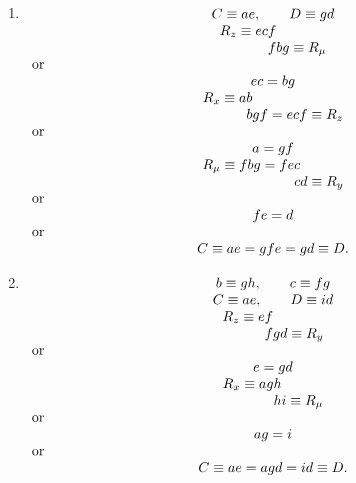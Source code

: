 \begin{enumerate}
\bigskip

\item $\begin{array}[t]{c}
C \equiv ae, \qquad D \equiv gd\\
\begin{array}{r@{}c@{}l}
R_z \equiv ec&f&\\
      &f&bg \equiv R_\mu
\end{array}\\
\makebox[\textwidth][l]{or}\\
ec = bg\\
\begin{array}{r@{}c@{}l}
R_x \equiv a&b&\\
      &b&gf = ecf \equiv  R_z
\end{array}\\
\makebox[\textwidth][l]{or}\\
a = gf\\
\begin{array}{r@{}c@{}l}
R_\mu \equiv fbg = fe&c&\\
      &c&d \equiv  R_y
\end{array}\\
\makebox[\textwidth][l]{or}\\
fe = d\\
\makebox[\textwidth][l]{or}\\
C \equiv ae = gfe = gd \equiv D.
\end{array}$

\bigskip

\item $\begin{array}[t]{c}
b \equiv gh, \qquad c \equiv fg\\
C \equiv ae, \qquad D \equiv id\\
\begin{array}{r@{}c@{}l}
R_z \equiv e&f&\\
      &f&gd \equiv R_y
\end{array}\\
\makebox[\textwidth][l]{or}\\
e = gd\\
\begin{array}{r@{}c@{}l}
R_x \equiv ag&h&\\
      &h&i \equiv R_\mu
\end{array}\\
\makebox[\textwidth][l]{or}\\
ag = i\\
\makebox[\textwidth][l]{or}\\
C \equiv ae = agd = id \equiv D.
\end{array}$


\end{enumerate}
